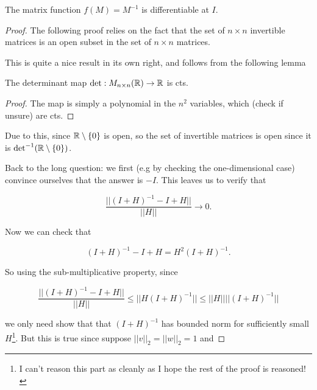 \documentclass[11pt]{scrartcl}
\begin{document}
\begin{example}
[2019 P1L]

The matrix function $f(M) = M^{-1}$ is differentiable at $I$.

\begin{proof}

    The following proof relies on the fact that the set of $n \times n$ invertible matrices is an open subset in the set of $n \times n$ matrices.

    This is quite a nice result in its own right, and follows from the following lemma

    \begin{lemma}
        The determinant map $\det : M_{n \times n}(\mathbb{R}) \to \mathbb R$ is cts.

        \begin{proof}
            The map is simply a polynomial in the $n^2$ variables, which (check if unsure) are cts.
        \end{proof}
    \end{lemma}

    Due to this, since $\mathbb R \setminus \{ 0 \}$ is open, so the set of invertible matrices is open since it is $\det^{-1}(\mathbb R \setminus \{ 0 \})$.

    Back to the long question: we first (e.g by checking the one-dimensional case) convince ourselves that the answer is $-I$. This leaves us to verify that

    \begin{equation}
        \frac{ || (I+H)^{-1} - I + H|| }{|| H ||} \to 0.
    \end{equation}

    Now we can check that 

    \begin{equation}
        (I+H)^{-1} - I + H = H^2 (I + H)^{-1}.
    \end{equation}

    So using the sub-multiplicative property, since 
    
    \begin{equation}
        \frac{ || (I+H)^{-1} - I + H|| }{|| H ||} \le ||H (I+H)^{-1}|| \le ||H|| ||(I+H)^{-1}||
    \end{equation}

    we only need show that that $(I+H)^{-1}$ has bounded norm for sufficiently small $H$\footnote{I can't reason this part as cleanly as I hope the rest of the proof is reasoned!}. But this is true since suppose $||v||_2 = ||w||_2 = 1$ and 


\end{proof}
\end{example}
\end{document}
